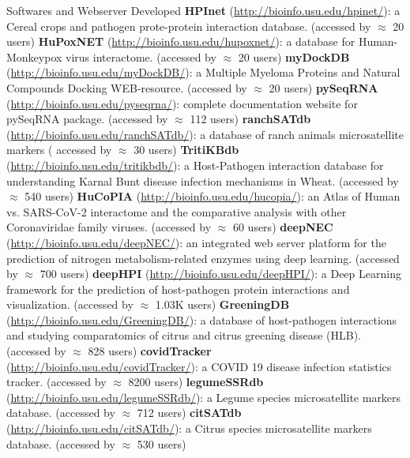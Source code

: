 \begin{rubric}{Softwares and Webserver Developed}
\entrys[]\textbf{HPInet} (\href{http://bioinfo.usu.edu/hpinet/} {http://bioinfo.usu.edu/hpinet/}): a Cereal crops and pathogen prote-protein interaction database. (accessed by $\approx$ 20 users)
\entrys[]\textbf{HuPoxNET} (\href{http://bioinfo.usu.edu/hupoxnet/} {http://bioinfo.usu.edu/hupoxnet/}): a database for Human-Monkeypox virus interactome. (accessed by $\approx$ 20 users)
\entrys[]\textbf{myDockDB} (\href{http://bioinfo.usu.edu/myDockDB/} {http://bioinfo.usu.edu/myDockDB/}): a Multiple Myeloma Proteins and Natural Compounds Docking WEB-resource. (accessed by $\approx$ 20 users)
\entrys[]\textbf{pySeqRNA} (\href{http://bioinfo.usu.edu/pyseqrna/} {http://bioinfo.usu.edu/pyseqrna/}): complete documentation website for pySeqRNA package. (accessed by $\approx$ 112 users)
\entrys[]\textbf{ranchSATdb} (\href{http://bioinfo.usu.edu/ranchSATdb/} {http://bioinfo.usu.edu/ranchSATdb/}): a database of ranch animals microsatellite markers ( accessed by $\approx$ 30 users)
\entrys[]\textbf{TritiKBdb} (\href{http://bioinfo.usu.edu/tritikbdb/} {http://bioinfo.usu.edu/tritikbdb/}): a Host-Pathogen interaction database for understanding Karnal Bunt disease infection mechanisms in Wheat. (accessed by $\approx$ 540 users)
\entrys[]\textbf{HuCoPIA} (\href{http://bioinfo.usu.edu/hucopia/} {http://bioinfo.usu.edu/hucopia/}): an Atlas of Human vs. SARS-CoV-2 interactome and the comparative analysis with other Coronaviridae family viruses. (accessed by $\approx$ 60 users)
\entrys[]\textbf{deepNEC} (\href{http://bioinfo.usu.edu/deepNEC/} {http://bioinfo.usu.edu/deepNEC/}): an integrated web server platform for the prediction of nitrogen metabolism-related enzymes using deep learning. (accessed by $\approx$ 700 users)
\entrys[]\textbf{deepHPI} (\href{http://bioinfo.usu.edu/deepHPI/} {http://bioinfo.usu.edu/deepHPI/}): a Deep Learning framework for the prediction of host-pathogen protein interactions and visualization. (accessed by $\approx$ 1.03K users)
\entrys[]\textbf{GreeningDB} (\href{http://bioinfo.usu.edu/GreeningDB/} {http://bioinfo.usu.edu/GreeningDB/}): a database of host-pathogen interactions and studying
comparatomics of citrus and citrus greening disease (HLB). (accessed by $\approx$ 828 users)
\entrys[]\textbf{covidTracker} (\href{http://bioinfo.usu.edu/covidTracker/} {http://bioinfo.usu.edu/covidTracker/}): a COVID 19 disease infection statistics tracker. (accessed by $\approx$ 8200 users)
\entrys[]\textbf{legumeSSRdb} (\href{http://bioinfo.usu.edu/legumeSSRdb/}{http://bioinfo.usu.edu/legumeSSRdb/}): a Legume species microsatellite markers database. (accessed by $\approx$ 712 users)
\entrys[]\textbf{citSATdb} (\href{http://bioinfo.usu.edu/citSATdb/} {http://bioinfo.usu.edu/citSATdb/}): a Citrus species microsatellite markers database. (accessed by $\approx$ 530 users)
\end{rubric}
    
